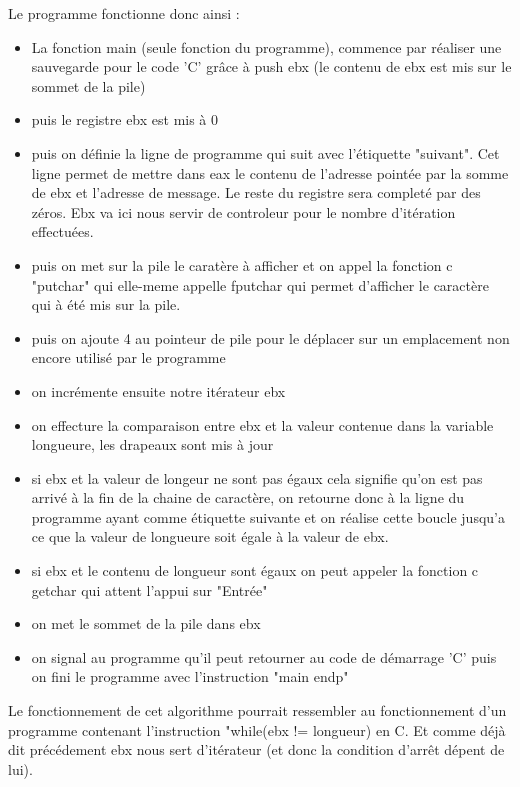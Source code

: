 \documentclass[11pt]{report}
\begin{document}
Le programme fonctionne donc ainsi :
\begin{itemize}
\item La fonction main (seule fonction du programme), commence par réaliser une sauvegarde pour le code 'C' grâce à push ebx (le contenu de ebx est mis sur le sommet de la pile) 

\item puis le registre ebx est mis à 0
\item puis on définie la ligne de programme qui suit avec l'étiquette "suivant". Cet ligne permet de mettre dans eax le contenu de l'adresse pointée par la somme de ebx et l'adresse de message. Le reste du registre sera completé par des zéros. Ebx va ici nous servir de controleur pour le nombre d'itération effectuées.
\item puis on met sur la pile le caratère à afficher et on appel la fonction c "putchar" qui elle-meme appelle fputchar qui permet d'afficher le caractère qui à été mis sur la pile.
\item puis on ajoute 4 au pointeur de pile pour le déplacer sur un emplacement non encore utilisé par le programme
\item on incrémente ensuite notre itérateur ebx
\item on effecture la comparaison entre ebx et la valeur contenue dans la variable longueure, les drapeaux sont mis à jour
\item si ebx et la valeur de longeur ne sont pas égaux cela signifie qu'on est pas arrivé à la fin de la chaine de caractère, on retourne donc à la ligne du programme ayant comme étiquette suivante et on réalise cette boucle jusqu'a ce que la valeur de longueure soit égale à la valeur de ebx.
\item si ebx et le contenu de longueur sont égaux on peut appeler la fonction c getchar qui attent l'appui sur "Entrée"
\item on met le sommet de la pile dans ebx
\item on signal au programme qu'il peut retourner au code de démarrage 'C' puis on fini le programme avec l'instruction "main endp"

\end{itemize}

Le fonctionnement de cet algorithme pourrait ressembler au fonctionnement d'un programme contenant l'instruction "while(ebx != longueur) en C. Et comme déjà dit précédement ebx nous sert d'itérateur (et donc la condition d'arrêt dépent de lui).
\end{document}
